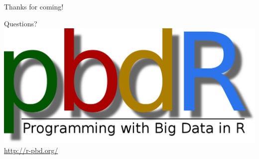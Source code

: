 \begin{frame}[noframenumbering]
 \begin{block}{Thanks for coming!}
 \begin{center}
 \vspace{.4cm}
     {\Huge Questions?}\\[.8cm]
\includegraphics[scale=.1]{../common/pics/logos/newpbdr}
\\[.1cm]
\url{http://r-pbd.org/}
  \end{center}
 \end{block}
\end{frame}
